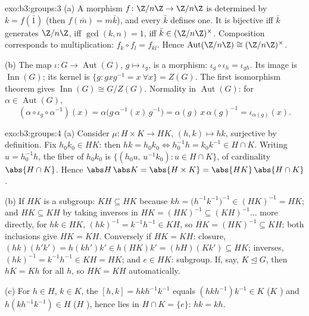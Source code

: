 \begin{solution}{exo:b3:groups:3}
(a) A morphism $f \colon \Z/n\Z \to \Z/n\Z$ is determined by $k =
f(\bar 1)$ (then $f(\bar m) = m\bar k$), and every $\bar k$ defines
one. It is bijective iff $\bar k$ generates $\Z/n\Z$, iff
$\gcd(k,n) = 1$, iff $\bar k \in (\Z/n\Z)^\times$. Composition
corresponds to multiplication: $f_k \circ f_l = f_{kl}$. Hence
$\operatorname{Aut}(\Z/n\Z) \cong (\Z/n\Z)^\times$.

(b) The map $\iota\colon G \to \operatorname{Aut}(G)$, $g \mapsto
\iota_g$, is a morphism: $\iota_g \circ \iota_h = \iota_{gh}$. Its
image is $\operatorname{Inn}(G)$; its kernel is $\{g : gxg^{-1} =
x\ \forall x\} = Z(G)$. The first isomorphism theorem gives
$\operatorname{Inn}(G) \cong G/Z(G)$. Normality in
$\operatorname{Aut}(G)$: for $\alpha \in \operatorname{Aut}(G)$,
\[
(\alpha \circ \iota_g \circ \alpha^{-1})(x)
= \alpha\bigl(g\,\alpha^{-1}(x)\,g^{-1}\bigr)
= \alpha(g)\, x\, \alpha(g)^{-1} = \iota_{\alpha(g)}(x).
\]
\end{solution}

\begin{solution}{exo:b3:groups:4}
(a) Consider $\mu \colon H \times K \to HK$, $(h,k) \mapsto hk$,
surjective by definition. Fix $h_0k_0 \in HK$: then $hk = h_0k_0
\iff h_0^{-1}h = k_0 k^{-1} \in H \cap K$. Writing $u =
h_0^{-1}h$, the fiber of $h_0k_0$ is $\{(h_0u,\, u^{-1}k_0) : u
\in H \cap K\}$, of cardinality $\abs{H \cap K}$. Hence $\abs
H\,\abs K = \abs{H\times K} = \abs{HK}\,\abs{H \cap K}$.

(b) If $HK$ is a subgroup: $KH \subseteq HK$ because $kh =
\bigl(h^{-1}k^{-1}\bigr)^{-1} \in (HK)^{-1} = HK$; and $HK
\subseteq KH$ by taking inverses in $HK = (HK)^{-1} \subseteq
(KH)^{-1}\dots$ more directly, for $hk \in HK$, $(hk)^{-1} =
k^{-1}h^{-1} \in KH$, so $HK = (HK)^{-1} \subseteq KH$; both
inclusions give $HK = KH$. Conversely if $HK = KH$: closure,
$(hk)(h'k') = h(kh')k' \in h(HK)k' = (hH)(Kk') \subseteq HK$;
inverses, $(hk)^{-1} = k^{-1}h^{-1} \in KH = HK$; and $e \in HK$:
subgroup. If, say, $K \trianglelefteq G$, then $hK = Kh$ for all
$h$, so $HK = KH$ automatically.

(c) For $h \in H$, $k \in K$, the  $[h,k] = hkh^{-1}
k^{-1}$ equals $(hkh^{-1})k^{-1} \in K$ ($K$ ) and
$h(kh^{-1}k^{-1}) \in H$ ($H$ ), hence lies in $H \cap K =
\{e\}$: $hk = kh$.
\end{solution}

